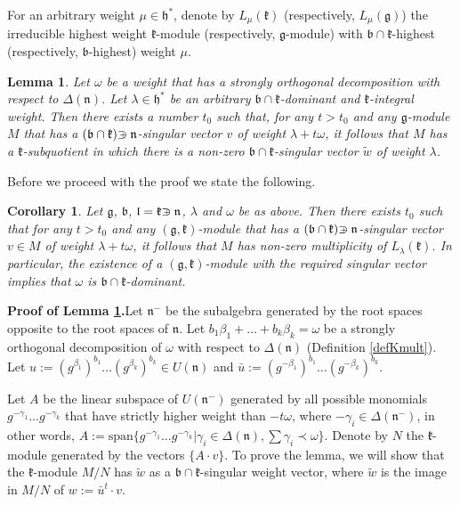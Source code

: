 \documentclass[12pt]{report}
\newtheorem{lemma}[theo]{Lemma}
\newtheorem{corollary}[theo]{Corollary}
\newcommand{\kk}{\mathfrak{k}}
\newcommand{\nn}{\mathfrak{n}}
\newcommand{\hh}{\mathfrak{h}}
\newcommand{\gG}{\mathfrak{g}}
\newcommand{\bb}{\mathfrak{b}}
\newcommand{\lL}{\mathfrak{l}}
\newcommand{\refle}[1]{Lemma \ref{#1}}
\newcommand{\refdef}[1]{Definition \ref{#1}}
\newcommand{\linspan}{\mathrm{span}}
\def\crplus{\hbox{$\supset${\raise1.05pt\hbox{\kern -0.60em ${\scriptscriptstyle +}$}}\ }}
\begin{document}
For an arbitrary weight $\mu\in\hh^*$, denote by $L_{\mu}(\kk)$ (respectively, $L_{\mu}(\gG)$) the irreducible highest weight $\kk$-module (respectively, $\gG$-module) with $\bb\cap\kk$-highest (respectively, $\bb$-highest) weight $\mu$.
\begin{lemma}\label{leMultMain}
Let $\omega$ be a weight that has a strongly orthogonal decomposition with respect to $\Delta(\nn)$. Let $\lambda\in\hh^*$ be an arbitrary $\bb\cap\kk$-dominant and $\kk$-integral weight. Then there exists a number $t_0$ such that, for any $t>t_0$ and any $\gG$-module $M$ that has a $(\bb\cap\kk)\crplus\nn$-singular vector $v$ of weight $\lambda+t\omega$, it follows that $M$ has a $\kk$-subquotient in which there is a non-zero $\bb\cap\kk$-singular vector $\tilde w$ of weight $\lambda$.
\end{lemma}
Before we proceed with the proof we state the following.
\begin{corollary}
\label{corMultMain}
Let $\gG$, $\bb$, $\lL=\kk\crplus\nn$, $\lambda$ and $\omega$ be as above. Then there exists $t_0$ such that for any $t>t_0$ and any $(\gG,\kk)$-module that has a $(\bb\cap\kk)\crplus\nn$-singular vector $v\in M$ of weight $\lambda+t\omega$, it follows that $M$ has non-zero multiplicity of $L_\lambda(\kk)$. In particular, the existence of a $(\gG,\kk)$-module with the required singular vector implies that $\omega$ is $\bb\cap\kk$-dominant.
\end{corollary}
\textbf{Proof of \refle{leMultMain}.}Let $\nn^-$ be the subalgebra generated by the root spaces opposite to the root spaces of $\nn$. Let $b_1\beta_1+\dots +b_k\beta_k=\omega$ be a strongly orthogonal decomposition of $\omega$ with respect to $\Delta(\nn)$ (\refdef{defKmult}). Let $u:=(g^{\beta_1 })^{b_1}\dots (g^{ \beta_k})^{b_k} \in U(\nn)$ and $\bar u:= (g^{-\beta_1 })^{b_1}\dots (g^{ -\beta_k})^{b_k}$. 

Let $A$ be the linear subspace of $U(\nn^-)$ generated by all possible monomials $g^{-\gamma_1}\dots g^{-\gamma_k}$ that have strictly higher weight than $-t\omega$, where $-\gamma_i\in \Delta(\nn^-)$, in other words, $A:=\linspan \{g^{-\gamma_1}\dots g^{-\gamma_k}|\gamma_i\in\Delta(\nn), \sum\gamma_i\prec\omega\}$. Denote by $N$ the $\kk$-module generated by the vectors $\{A\cdot v\}$. To prove the lemma, we will show that the $\kk$-module $M/N$ has $\tilde w$  as a $\bb\cap\kk$-singular weight vector, where $\tilde w$ is the image in $M/N$ of $w:=\bar u^{t}\cdot v$. 
\end{document}
